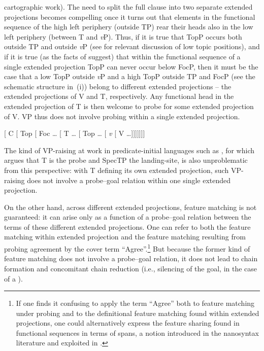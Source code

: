 \documentclass[output=paper]{langsci/langscibook}
\begin{document}
\begin{refcontext}
{    cartographic work). The need to split the full clause into two separate
    extended projections becomes compelling once it turns out that elements in
    the functional sequence of the high left periphery (outside TP) rear their
    heads also in the low left periphery (between T and \emph{v}P). Thus, if it is
    true that TopP occurs both outside TP and outside \emph{v}P (see
    \citealt{belletti04} for relevant discussion of low topic positions), and
    if it is true (as the facts of  suggest) that within the
    functional sequence of a single extended projection TopP can never occur
    below FocP, then it must be the case that a low TopP outside \emph{v}P and
    a high TopP outside TP and FocP (see the schematic structure
    in~(i)) belong to different extended projections -- the extended
    projections of V and T, respectively. Any functional head in the extended
    projection of T is then welcome to probe for some extended projection of V.
    VP  thus does not involve probing within a single extended
    projection.

\begin{exe}
     {}[ C [ Top [ Foc \ldots{} [
    T \ldots{} [ Top \ldots{} [ \emph{v} [ V \ldots{}]]]]]]] \label{fnexx}
\end{exe}
The kind of VP-raising at work in predicate-initial languages such as
,
for which \cite{massam01pred} argues that T is the probe and SpecTP the
landing-site, is also unproblematic from this perspective: with T defining its
own extended projection, such VP-raising does not involve a probe--goal relation
within one single extended projection.}

On the other hand, across different extended projections, feature matching is
not guaranteed: it can arise only as a function of a probe--goal relation
between the terms of these different extended projections. One can refer to
both the feature matching within extended projection and the feature matching
resulting from probing agreement by the cover term \enquote{Agree}.\footnote{If one
    finds it confusing to apply the term \enquote{Agree} both to feature matching
    under probing and to the definitional feature matching found within
extended projections, one could alternatively express the feature sharing found
in functional sequences in terms of spans, a notion introduced in the
nanosyntax literature and exploited in .} But because the
former kind of feature matching does not involve a probe--goal relation, it does
not lead to chain formation and concomitant chain reduction (i.e., silencing of
the goal, in the case of a ).


\end{refcontext}
\end{document}
